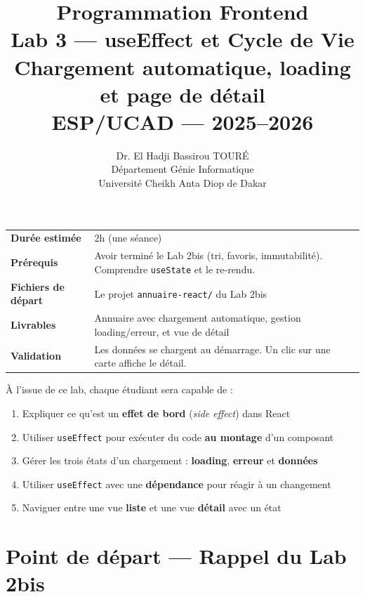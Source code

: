 \documentclass[11pt,a4paper]{article}
\title{\vspace{-1cm}\textbf{\LARGE Programmation Frontend}\\[0.8cm]\textbf{\huge Lab 3 --- useEffect et Cycle de Vie}\\[0.3cm]\textbf{\Large Chargement automatique, loading et page de détail}\\[0.5cm]\large ESP/UCAD --- 2025--2026}
\author{Dr. El Hadji Bassirou TOURÉ\\Département Génie Informatique\\Université Cheikh Anta Diop de Dakar}
\date{}
\begin{document}
\maketitle
\thispagestyle{empty}
\vspace{0.5cm}

\begin{prereqbox}
\begin{center}
\begin{tabular}{lp{10cm}}
\toprule
\textbf{Durée estimée} & 2h (une séance) \\
\textbf{Prérequis} & Avoir terminé le Lab 2bis (tri, favoris, immutabilité). Comprendre \texttt{useState} et le re-rendu. \\
\textbf{Fichiers de départ} & Le projet \texttt{annuaire-react/} du Lab 2bis \\
\textbf{Livrables} & Annuaire avec chargement automatique, gestion loading/erreur, et vue de détail \\
\textbf{Validation} & Les données se chargent au démarrage. Un clic sur une carte affiche le détail. \\
\bottomrule
\end{tabular}
\end{center}
\end{prereqbox}

\begin{objectifbox}
À l'issue de ce lab, chaque étudiant sera capable de :
\begin{enumerate}[nosep]
\item Expliquer ce qu'est un \textbf{effet de bord} (\emph{side effect}) dans React
\item Utiliser \texttt{useEffect} pour exécuter du code \textbf{au montage} d'un composant
\item Gérer les trois états d'un chargement : \textbf{loading}, \textbf{erreur} et \textbf{données}
\item Utiliser \texttt{useEffect} avec une \textbf{dépendance} pour réagir à un changement
\item Naviguer entre une vue \textbf{liste} et une vue \textbf{détail} avec un état
\end{enumerate}
\end{objectifbox}

\tableofcontents
\newpage

\section{Point de départ --- Rappel du Lab 2bis}
\end{document}
